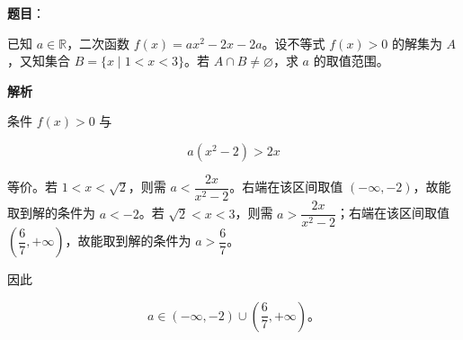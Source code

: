 \begin{answer}

\textbf{题目}：

已知 $a\in\mathbb R$，二次函数 $f(x)=ax^2-2x-2a$。设不等式 $f(x)>0$ 的解集为 $A$，又知集合 $B=\{x\mid1<x<3\}$。若 $A\cap B\ne\varnothing$，求 $a$ 的取值范围。

\textbf{解析}

条件 $f(x)>0$ 与

\nopagebreak[4]
\[
a(x^2-2)>2x
\]

等价。若 $1<x<\sqrt2$，则需 $a<\dfrac{2x}{x^2-2}$。右端在该区间取值 $(-\infty,-2)$，故能取到解的条件为 $a<-2$。若 $\sqrt2<x<3$，则需 $a>\dfrac{2x}{x^2-2}$；右端在该区间取值 $\left(\dfrac67,+\infty\right)$，故能取到解的条件为 $a>\dfrac67$。

因此

\nopagebreak[4]
\[
a\in(-\infty,-2)\cup\left(\frac67,+\infty\right)\text{。}
\]


\end{answer}
